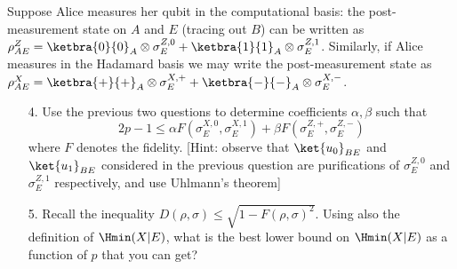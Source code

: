 \begin{exercises}
Suppose Alice measures her qubit in the computational basis: the post-measurement state on $A$ and $E$ (tracing out $B$) can be written as $\rho_{AE}^Z = \ketbra{0}{0}_A\otimes \sigma_E^{Z,0} + \ketbra{1}{1}_A\otimes \sigma_E^{Z,1}$. Similarly, if Alice measures in the Hadamard basis we may write the post-measurement state as $\rho_{AE}^X = \ketbra{+}{+}_A\otimes \sigma_E^{X,+} + \ketbra{-}{-}_A\otimes \sigma_E^{X,-}$.
\begin{enumerate}
\item[4.] Use the previous two questions to determine coefficients $\alpha,\beta$ such that
$$ 2p-1 \leq \alpha F(\sigma_E^{X,0},\sigma_E^{X,1}) + \beta F(\sigma_E^{Z,+},\sigma_E^{Z,-})$$
where $F$ denotes the fidelity. [Hint: observe that $\ket{u_0}_{BE}$ and $\ket{u_1}_{BE}$ considered in the previous question are purifications of $\sigma_E^{Z,0}$ and $\sigma_E^{Z,1}$ respectively, and use Uhlmann's theorem]
\item[5.] Recall the inequality $D(\rho,\sigma) \leq \sqrt{1-F(\rho,\sigma)^2}$. Using also the definition of $\Hmin (X|E)$, what is the best lower bound on $\Hmin(X|E)$ as a function of $p$ that you can get?

\end{enumerate}
\end{exercises}
